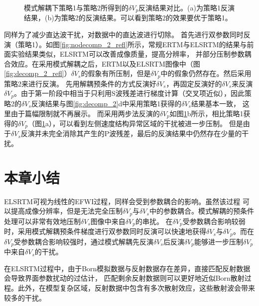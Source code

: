 \begin{figure}[!htb]
   \centering
   \caption{
   模式解耦下策略1与策略2所得到的$\delta
   V_p$反演结果对比。(a)为策略1反演结果，(b)为策略2的反演结果。可以看到策略2的效果要优于策略1。}
   \label{fig:final_comparison_2}
\end{figure}
同样为了减少直达波干扰，对数据中的直达波进行切除。
首先进行双参数同时反演（策略1）。如图\ref{fig:nodecomp_2_refl}所示，常规ERTM与ELSRTM的结果与前面实验结果类似，ELSRTM可以改善成像质量，提高分辨率，
并部分压制参数耦合效应。在采用模式解耦之后，ERTM以及ELSRTM图像中（图\ref{fig:decomp_2_refl}）$\delta
V_s$的假象有所压制，但是$\delta
V_p$中的假象仍然存在。然后采用策略2来进行反演。
先用解耦预条件的方式反演好$\delta V_s$，再固定反演好的$\delta V_s$来反演$\delta
V_p$。由于第一阶段中相当于只利用S波残差进行梯度计算（交叉项近似），因此策略2的$\delta
V_s$反演结果与图\ref{fig:decomp_2}d中采用策略1获得的$\delta V_s$结果基本一致，
这里由于篇幅限制就不再展示。
而采用两步法反演的$\delta
V_p$如图\ref{fig:final_comparison_2}b所示，相比策略1获得的$\delta
V_p$（图\ref{fig:final_comparison_2}a），可以看到左侧速度结构异常区域的干扰被进一步压制。
但是由于$\delta V_s$反演并未完全消除其产生的P波残差，最后的反演结果中仍然存在少量的干扰。
\section{本章小结}
ELSRTM可视为线性的EFWI过程，同样会受到参数耦合的影响。虽然该过程
可以提高成像分辨率，但是无法完全压制$\delta V_p$与$\delta V_s$中的参数耦合。模式解耦的预条件处理可以非常有效地压制$\delta
V_s$图像中来自$\delta V_p$的串扰。
在$\delta V_p$受参数耦合影响较弱时，采用模式解耦预条件梯度进行双参数同时反演可以快速地获得$\delta
V_s$与$\delta V_p$。而在$\delta V_p$受参数耦合影响较强时，通过模式解耦先反演$\delta V_s$后反演$\delta
V_p$能够进一步压制$\delta V_p$中来自$\delta V_s$的干扰。

在ELSRTM过程中，由于Born模拟数据与反射数据存在差异，直接匹配反射数据会导致界面参数扰动的过估计，
匹配剩余反射数据则可以更好地近似Born散射过程。此外，在模型复杂区域，反射数据中包含有多次散射效应，这些散射波会带来较多的干扰。

